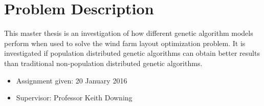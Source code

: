\section*{Problem Description}
This master thesis is an investigation of how different genetic algorithm models perform when used to solve the wind farm layout optimization problem. It is investigated if population distributed genetic algorithms can obtain better results than traditional non-population distributed genetic algorithms. 


\begin{itemize}
\item Assignment given: 20 January 2016
\item Supervisor: Professor Keith Downing
\end{itemize}